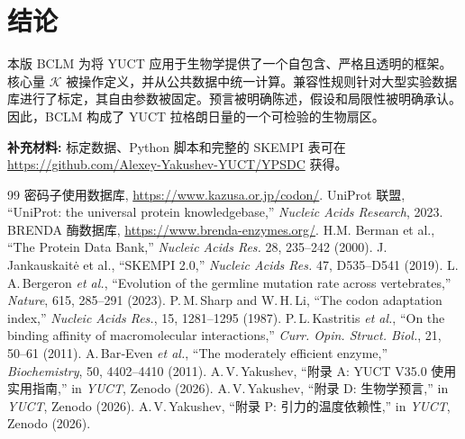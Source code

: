 \documentclass[12pt,a4paper]{article}
\newcommand{\REL}{\mathcal{K}}          %
\begin{document}
	\section{结论}
	本版 BCLM 为将 YUCT 应用于生物学提供了一个自包含、严格且透明的框架。核心量 \(\REL\) 被操作定义，并从公共数据中统一计算。兼容性规则针对大型实验数据库进行了标定，其自由参数被固定。预言被明确陈述，假设和局限性被明确承认。因此，BCLM 构成了 YUCT 拉格朗日量的一个可检验的生物扇区。
	
	\vspace{0.5cm}
	\noindent\textbf{补充材料:} 标定数据、Python 脚本和完整的 SKEMPI 表可在 \url{https://github.com/Alexey-Yakushev-YUCT/YPSDC} 获得。
	
	\begin{thebibliography}{99}
		 密码子使用数据库, \url{https://www.kazusa.or.jp/codon/}.
		 UniProt 联盟, ``UniProt: the universal protein knowledgebase,'' \emph{Nucleic Acids Research}, 2023.
		 BRENDA 酶数据库, \url{https://www.brenda-enzymes.org/}.
		 H.M. Berman et al., ``The Protein Data Bank,'' \emph{Nucleic Acids Res.} 28, 235–242 (2000).
		 J. Jankauskaitė et al., ``SKEMPI 2.0,'' \emph{Nucleic Acids Res.} 47, D535–D541 (2019).
		 L.\,A.\,Bergeron \emph{et al.}, ``Evolution of the germline mutation rate across vertebrates,'' \emph{Nature}, 615, 285–291 (2023).
		 P.\,M.\,Sharp and W.\,H.\,Li, ``The codon adaptation index,'' \emph{Nucleic Acids Res.}, 15, 1281–1295 (1987).
		 P.\,L.\,Kastritis \emph{et al.}, ``On the binding affinity of macromolecular interactions,'' \emph{Curr. Opin. Struct. Biol.}, 21, 50–61 (2011).
		 A.\,Bar‑Even \emph{et al.}, ``The moderately efficient enzyme,'' \emph{Biochemistry}, 50, 4402–4410 (2011).
		 A.\,V.\,Yakushev, ``附录 A: YUCT V35.0 使用实用指南,'' in \emph{YUCT}, Zenodo (2026).
		 A.\,V.\,Yakushev, ``附录 D: 生物学预言,'' in \emph{YUCT}, Zenodo (2026).
		 A.\,V.\,Yakushev, ``附录 P: 引力的温度依赖性,'' in \emph{YUCT}, Zenodo (2026).
	\end{thebibliography}
	
\end{document}
